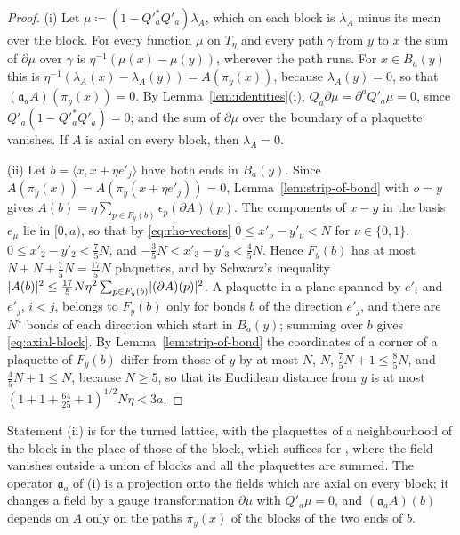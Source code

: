 \documentclass[11pt]{preprint}
\DeclarePairedDelimiter{\abs}{\lvert}{\rvert}
\numberwithin{equation}{section}
\theoremstyle{definition}
\theoremstyle{remark}
\theoremstyle{plain}
\begin{document}
\begin{proof}
(i) Let $\mu \coloneqq (1 - Q'^*_aQ'_a)\lambda_A$, which on each block is $\lambda_A$ minus its mean over the block. For every function $\mu$ on $T_\eta$ and every path $\gamma$ from $y$ to $x$ the sum of $\partial\mu$ over $\gamma$ is $\eta^{-1}(\mu(x) - \mu(y))$, wherever the path runs. For $x \in B_a(y)$ this is $\eta^{-1}(\lambda_A(x) - \lambda_A(y)) = A(\pi_y(x))$, because $\lambda_A(y) = 0$, so that $(\mathfrak a_aA)(\pi_y(x)) = 0$. By Lemma~\ref{lem:identities}(i), $Q_a\partial\mu = \partial^aQ'_a\mu = 0$, since $Q'_a(1 - Q'^*_aQ'_a) = 0$; and the sum of $\partial\mu$ over the boundary of a plaquette vanishes. If $A$ is axial on every block, then $\lambda_A = 0$.

(ii) Let $b = \langle x, x + \eta e'_j\rangle$ have both ends in $B_a(y)$. Since $A(\pi_y(x)) = A(\pi_y(x + \eta e'_j)) = 0$, Lemma~\ref{lem:strip-of-bond} with $o = y$ gives $A(b) = \eta\sum_{p \in F_y(b)}\epsilon_p(\partial A)(p)$. The components of $x - y$ in the basis $e_\mu$ lie in $[0, a)$, so that by \eqref{eq:rho-vectors} $0 \leq x'_\nu - y'_\nu < N$ for $\nu \in \{ 0, 1 \}$, $0 \leq x'_2 - y'_2 < \frac75N$, and $-\frac35N < x'_3 - y'_3 < \frac45N$. Hence $F_y(b)$ has at most $N + N + \frac75N = \frac{17}{5}N$ plaquettes, and by Schwarz's inequality $\abs{A(b)}^2 \leq \frac{17}{5}N\eta^2\sum_{p \in F_y(b)}\abs{(\partial A)(p)}^2$. A plaquette in a plane spanned by $e'_i$ and $e'_j$, $i < j$, belongs to $F_y(b)$ only for bonds $b$ of the direction $e'_j$, and there are $N^4$ bonds of each direction which start in $B_a(y)$; summing over $b$ gives \eqref{eq:axial-block}. By Lemma~\ref{lem:strip-of-bond} the coordinates of a corner of a plaquette of $F_y(b)$ differ from those of $y$ by at most $N$, $N$, $\frac75N + 1 \leq \frac85N$, and $\frac45N + 1 \leq N$, because $N \geq 5$, so that its Euclidean distance from $y$ is at most $(1 + 1 + \frac{64}{25} + 1)^{1/2}N\eta < 3a$.
\end{proof}

Statement (ii) is \cite[(2.123)]{BalabanPRT2} for the turned lattice, with the plaquettes of a neighbourhood of the block in the place of those of the block, which suffices for \cite[Lemma~2.4]{BalabanPRT2}, where the field vanishes outside a union of blocks and all the plaquettes are summed. The operator $\mathfrak a_a$ of (i) is a projection onto the fields which are axial on every block; it changes a field by a gauge transformation $\partial\mu$ with $Q'_a\mu = 0$, and $(\mathfrak a_aA)(b)$ depends on $A$ only on the paths $\pi_y(x)$ of the blocks of the two ends of $b$.
\end{document}
